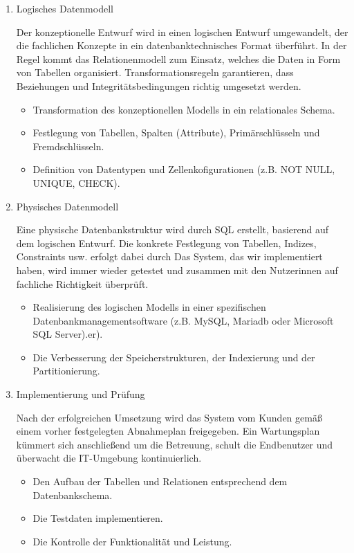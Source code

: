 \begin{enumerate}
\begin{itemize}
\end{itemize}

\item
Logisches Datenmodell

Der konzeptionelle Entwurf wird in einen logischen Entwurf umgewandelt, der die fachlichen Konzepte in ein datenbanktechnisches Format überführt.
In der Regel kommt das Relationenmodell zum Einsatz, welches die Daten in Form von Tabellen organisiert.
Transformationsregeln garantieren, dass Beziehungen und Integritätsbedingungen richtig umgesetzt werden.
\begin{itemize}

\item Transformation des konzeptionellen Modells in ein relationales Schema.
\item Festlegung von Tabellen, Spalten (Attribute), Primärschlüsseln und Fremdschlüsseln.
\item Definition von Datentypen und Zellenkofigurationen (z.B. NOT NULL, UNIQUE, CHECK).
\end{itemize}

\item
Physisches Datenmodell

Eine physische Datenbankstruktur wird durch \ac{SQL} erstellt, basierend auf dem logischen Entwurf.
Die konkrete Festlegung von Tabellen, Indizes, Constraints usw. erfolgt dabei durch  Das System,
das wir implementiert haben, wird immer wieder getestet und zusammen mit den Nutzerinnen auf fachliche Richtigkeit überprüft.
\begin{itemize}

\item Realisierung des logischen Modells in einer spezifischen Datenbankmanagementsoftware (z.B. MySQL, Mariadb oder Microsoft SQL Server).er).
\item Die Verbesserung der Speicherstrukturen, der Indexierung und der Partitionierung.

\end{itemize}

\item
Implementierung und Prüfung

Nach der erfolgreichen Umsetzung wird das System vom Kunden gemäß einem vorher festgelegten Abnahmeplan freigegeben.
Ein Wartungsplan kümmert sich anschließend um die Betreuung, schult die Endbenutzer und überwacht die IT-Umgebung kontinuierlich.
\begin{itemize}

\item Den Aufbau der Tabellen und Relationen entsprechend dem Datenbankschema.

\item Die Testdaten implementieren.

\item Die Kontrolle der Funktionalität und Leistung.

\end{itemize}

\end{enumerate}

\pagebreak
